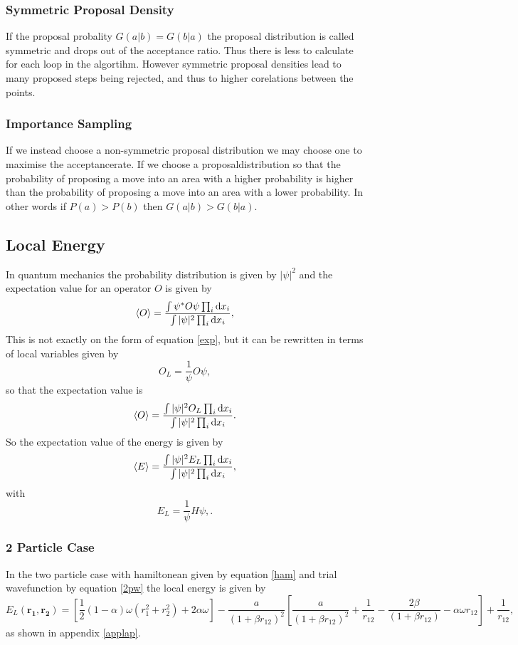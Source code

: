 \documentclass[a4paper,norsk,10pt]{article}
\newcommand{\bb}[1]{\boldsymbol{#1}}
\newcommand{\dd}{\mathrm{d}}
\newcommand{\be}{\begin{equation}}
\newcommand{\ee}{\end{equation}}
\newcommand{\f}{\frac}
\renewcommand{\braket}{\Braket}
\begin{document}
  

\subsubsection{Symmetric Proposal Density}

If the proposal probality $G(a|b) = G(b|a)$ the proposal distribution is called symmetric and drops out of the acceptance ratio.
Thus there is less to calculate for each loop in the algortihm. However symmetric proposal densities lead to many proposed steps being rejected,
and thus to higher corelations between the points.


\subsubsection{Importance Sampling}

If we instead choose a non-symmetric proposal distribution we may choose one to maximise the acceptancerate.
If we choose a proposaldistribution so that the probability of proposing a move into an area with a higher probability is higher than
the probability of proposing a move into an area with a lower probability. In other words
if $P(a)>P(b)$ then $G(a|b)>G(b|a)$.

\subsection{Local Energy}
In quantum mechanics the probability distribution is given by $|\psi|^2$ and the expectation value for an operator $O$ is given by
\be
\braket{O} = \f{\int\psi^*O\psi\prod_i\dd x_i}{\int|\psi|^2\prod_i\dd x_i},
\ee
This is not exactly on the form of equation \ref{exp}, but it can be rewritten in terms of local variables given by
\be
O_L = \f{1}{\psi}O\psi, \label{localdef}
\ee
so that the expectation value is
\be
\braket{O} =  \f{\int|\psi|^2O_L\prod_i\dd x_i}{\int|\psi|^2\prod_i\dd x_i}.
\ee
So the expectation value of the energy is given by
\be
\braket{E} =  \f{\int|\psi|^2E_L\prod_i\dd x_i}{\int|\psi|^2\prod_i\dd x_i},
\ee
with
\be
E_L = \f{1}{\psi}H\psi, \label{localEdef}.
\ee



\subsubsection{2 Particle Case}

In the two particle case with hamiltonean given by equation \ref{ham} and trial wavefunction by equation \ref{2pw} the local energy is given by
\be
E_L(\bb{r_1},\bb{r_2}) = \left[\f{1}{2}(1- \alpha)\omega(r_1^2 + r_2^2) + 2\alpha\omega\right]  - \f{a}{(1+\beta r_{12})^2}\left[\f{a}{(1+\beta r_{12})^2}+  \f{1}{r_{12}} - \f{2\beta}{(1+\beta r_{12})} -\alpha\omega r_{12}\right] + \f{1}{r_{12}},
\ee
as shown in appendix \ref{applap}.
\end{document}
